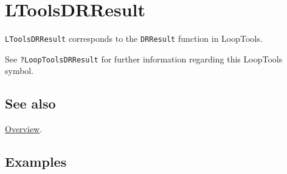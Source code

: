 \documentclass[../FeynHelpersManual.tex]{subfiles}
\begin{document}
\hypertarget{ltoolsdrresult}{
\section{LToolsDRResult}\label{ltoolsdrresult}}

\texttt{LToolsDRResult} corresponds to the \texttt{DRResult} function in
LoopTools.

See \texttt{?LoopTools\textasciigrave DRResult} for further information
regarding this LoopTools symbol.

\subsection{See also}

\hyperlink{toc}{Overview}.

\subsection{Examples}
\end{document}
